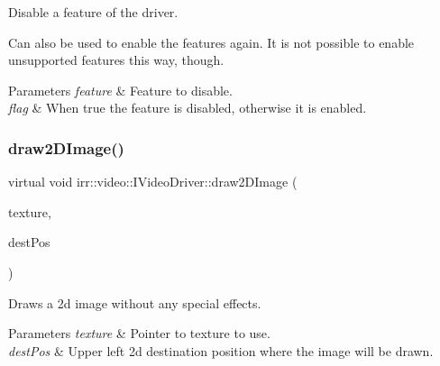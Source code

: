 Disable a feature of the driver. 

Can also be used to enable the features again. It is not possible to enable unsupported features this way, though. 
\begin{DoxyParams}{Parameters}
{\em feature} & Feature to disable. \\
\hline
{\em flag} & When true the feature is disabled, otherwise it is enabled. \\
\hline
\end{DoxyParams}
\mbox{\label{classirr_1_1video_1_1IVideoDriver_ac1f12aefefb24414e03876bca942fb02}} 
\subsubsection{\texorpdfstring{draw2\+D\+Image()}{draw2DImage()}\hspace{0.1cm}{\footnotesize\ttfamily [1/6]}}
{\footnotesize\ttfamily virtual void irr\+::video\+::\+I\+Video\+Driver\+::draw2\+D\+Image (\begin{DoxyParamCaption}\item[{const \hyperlink{classirr_1_1video_1_1ITexture}{video\+::\+I\+Texture} $\ast$}]{texture,  }\item[{const core\+::position2d$<$ \hyperlink{namespaceirr_ac66849b7a6ed16e30ebede579f9b47c6}{s32} $>$ \&}]{dest\+Pos }\end{DoxyParamCaption})\hspace{0.3cm}{\ttfamily [pure virtual]}}



Draws a 2d image without any special effects. 


\begin{DoxyParams}{Parameters}
{\em texture} & Pointer to texture to use. \\
\hline
{\em dest\+Pos} & Upper left 2d destination position where the image will be drawn. \\
\hline
\end{DoxyParams}
\mbox{\label{classirr_1_1video_1_1IVideoDriver_ac1f12aefefb24414e03876bca942fb02}} 
